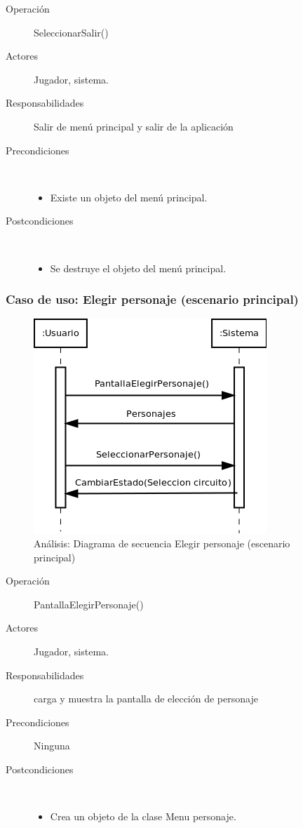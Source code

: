 \begin{description}
    \item [Operación] SeleccionarSalir()
    \item [Actores] Jugador, sistema.
    \item [Responsabilidades] Salir de menú principal y salir de la aplicación
    \item [Precondiciones] $\quad$
        \begin{itemize}
            \item Existe un objeto del menú principal.
        \end{itemize}
    \item [Postcondiciones] $\quad$
        \begin{itemize}
            \item Se destruye el objeto del menú principal.
        \end{itemize}
\end{description}

\subsubsection{Caso de uso: Elegir personaje (escenario principal)}

\begin{figure}[H] 
  \label{secuencia_elegir_personaje}
  \begin{center}
    \includegraphics[scale=0.6]{imagenes/analisis/secuencia_elegir_personaje1.png}
  \end{center}
  \caption{Análisis: Diagrama de secuencia Elegir personaje (escenario principal)}
\end{figure}

\begin{description}
    \item [Operación] PantallaElegirPersonaje()
    \item [Actores] Jugador, sistema.
    \item [Responsabilidades] carga y muestra la pantalla de elección de personaje
    \item [Precondiciones] Ninguna
    \item [Postcondiciones] $\quad$
        \begin{itemize}
            \item Crea un objeto de la clase Menu personaje.
        \end{itemize}
\end{description}

